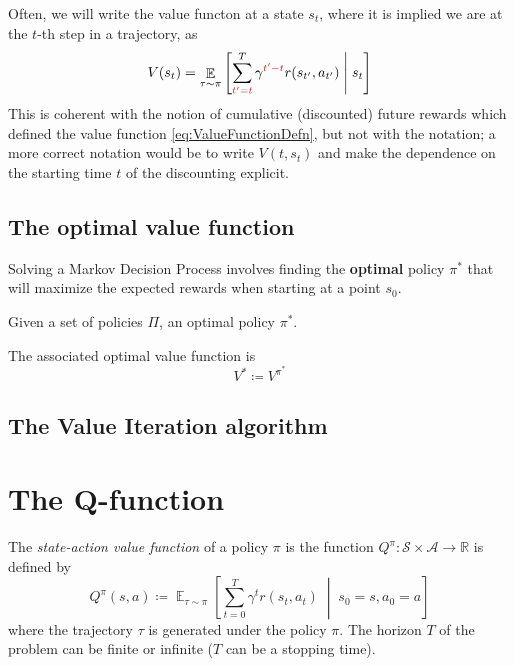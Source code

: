 \documentclass[12pt]{report}
\newcommand\RR{\mathbb{R}}
\newcommand{\scalemid}{\;\middle|\;}
\DeclareMathOperator{\EE}{\mathbb{E}}
\newcommand{\calA}{\mathcal{A}}
\newcommand{\calS}{\mathcal{S}}
\newcommand{\redfont}{\color{darkred}}
\newcommand{\bluefont}{\color{Blue}}
\begin{document}
\begin{remark}
	Often, we will write the value functon at a state $s_t$, where it is implied we are at the $t$-th step in a trajectory, as
	\[
		V(s_t) = \EE_{\tau\sim\pi}\left[
		\sum_{{\redfont t'=t}}^T \gamma^{{\redfont t'-t}} r(s_{t'}, a_{t'})
		\scalemid s_t
		\right]
	\]
	This is coherent with the notion of cumulative (discounted) future rewards which defined the value function \eqref{eq:ValueFunctionDefn}, but not with the notation; a more correct notation would be to write $V(t, s_t)$ and make the dependence on the starting time $t$ of the discounting explicit.
\end{remark}

\subsection{The optimal value function}

Solving a Markov Decision Process involves finding the \textbf{\bluefont optimal} policy $\pi^*$ that will maximize the expected rewards when starting at a point $s_0$.

\begin{defn}
	Given a set of policies $\Pi$, an optimal policy $\pi^*$.
	
	The associated optimal value function is
	\[
		V^* \coloneqq V^{\pi^*}
	\]
\end{defn}


\subsection{The Value Iteration algorithm}


\section{The $\boldsymbol{Q}$-function}



\begin{defn}
	The \textit{state-action value function} of a policy $\pi$ is the function $Q^\pi\colon \calS\times\calA\to \RR$ is defined by
	\begin{equation}
	Q^\pi(s, a) \coloneqq \EE_{\tau\sim \pi}
	\left[
	\sum_{t=0}^T \gamma^t r(s_t, a_t) \scalemid s_0 = s, a_0 = a
	\right]
	\end{equation}
	where the trajectory $\tau$ is generated under the policy $\pi$.
	The horizon $T$ of the problem can be finite or infinite ($T$ can be a stopping time).
\end{defn}
\end{document}
